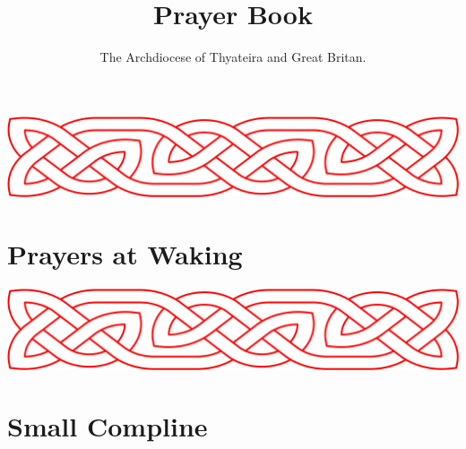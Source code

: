 \documentclass[8pt]{extarticle}
\title{Prayer Book}
\author{The Archdiocese of Thyateira and Great Britan.}
\begin{document}



\maketitle
\pagebreak
\tableofcontents
\pagebreak
\includegraphics[width=1\textwidth]{assets/celtic-knot-banner.png}
\section{Prayers at Waking}

\pagebreak
\includegraphics[width=1\textwidth]{assets/celtic-knot-banner.png}
\section{Small Compline}

\pagebreak
\end{document}
